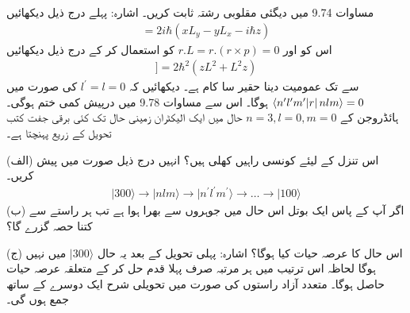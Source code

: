 مساوات \num{9.74} میں دیگئی  مقلوبی  رشتہ ثابت کریں۔ اشارہ: پہلے درج ذیل دیکھائیں
\begin{align*}
	[L^2, z] = 2i\hbar(xL_y-yL_x-i\hbar z)
\end{align*}
اس کو اور \(r.L = r.(r\times p) = 0\) کو استعمال کر کے درج ذیل دیکھائیں
\begin{align*}
[L^2, [L^2, z]] = 2\hbar^2(zL^2+L^2z)	
\end{align*}
 سے  تک عمومیت دینا حقیر سا  کام ہے۔
دیکھائیں کہ \(l^\prime = l = 0\) کی صورت میں \(\langle n^\prime l^\prime m^\prime \abs{r}nlm \rangle = 0\) ہوگا۔ اس سے مساوات \num{9.78} میں درپیش کمی ختم ہوگی۔
ہائڈروجن کے \(n = 3, l = 0, m = 0\) حال میں ایک الیکٹران زمینی حال تک کئی برقی جفت کتب تحویل کے زریع پہنچتا ہے۔

(الف) اس تنزل کے لیئے کونسی راہیں کھلی ہیں؟ انہیں درج ذیل صورت میں پیش کریں۔
\begin{align*}
	\mid300\rangle\rightarrow \mid nlm\rangle\rightarrow \mid n^\prime l^\prime m^\prime \rangle\rightarrow\dots\rightarrow\mid100\rangle
\end{align*}
(ب) اگر آپ کے پاس ایک بوتل اس حال میں جوہروں سے بھرا ہوا ہے تب ہر راستے سے کتنا حصہ گزرے گا؟

(ج) اس حال کا عرصہ حیات کیا ہوگا؟ اشارہ: پہلی تحویل کے بعد یہ حال \(\mid300\rangle\) میں نہیں ہوگا لحاظہ اس ترتیب میں ہر  مرتبہ  صرف پہلا قدم حل کر کے متعلقہ عرصہ حیات حاصل ہوگا۔ متعدد آزاد راستوں کی صورت میں تحویلی شرح ایک دوسرے کے ساتھ جمع ہوں گی۔

